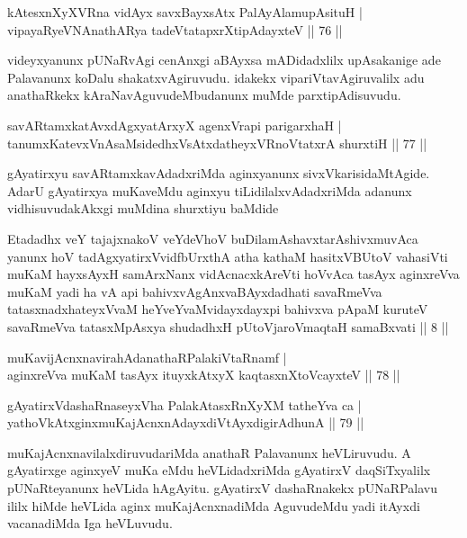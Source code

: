 \begin{shl}
kAtesxnXyXVRna vidAyx savxBayxsAtx PalAyAlamupAsituH | \\
vipayaRyeVNAnathARya tadeVtatapxrXtipAdayxteV \hfill||  76 ||
\end{shl}

\begin{artha} 
videyxyanunx pUNaRvAgi cenAnxgi aBAyxsa mADidadxlilx upAsakanige ade 
Palavanunx koDalu shakatxvAgiruvudu. idakekx vipariVtavAgiruvalilx adu 
anathaRkekx kAraNavAguvudeMbudanunx muMde parxtipAdisuvudu.
\end{artha}

\begin{shl}
savARtamxkatAvxdAgxyatArxyX agenxVrapi parigarxhaH | \\
tanumxKatevxVnAsaMsidedhxVsAtxdatheyxVRnoVtatxrA shurxtiH \hfill||  77 || 
\end{shl}

\begin{artha} 
gAyatirxyu savARtamxkavAdadxriMda aginxyanunx sivxVkarisidaMtAgide. 
AdarU gAyatirxya muKaveMdu aginxyu tiLidilalxvAdadxriMda adanunx 
vidhisuvudakAkxgi muMdina shurxtiyu baMdide\\
\begin{shl}
Etadadhx veY tajajxnakoV veYdeVhoV buDilamAshavxtarAshivxmuvAca yanunx hoV tadAgxyatirxVvidfbUrxthA atha kathaM hasitxVBUtoV vahasiVti muKaM hayxsAyxH samArxNanx vidAcnacxkAreVti hoVvAca tasAyx aginxreVva muKaM yadi ha vA api bahivxvAgAnxvaBAyxdadhati savaRmeVva tatasxnadxhateyxVvaM heYveYvaMvidayxdayxpi bahivxva pApaM kuruteV savaRmeVva tatasxMpAsxya shudadhxH pUtoV\s jaroV\s maqtaH samaBxvati || 8 ||
\end{shl}
\end{artha}


\begin{shl}
muKavijAcnxnavirahAdanathaRPalakiVtaRnamf | \\
aginxreVva muKaM tasAyx ituyxkAtxyX kaqtasxnXtoVcayxteV \hfill||  78 || 
\end{shl}

\begin{shl}
gAyatirxVdashaRnaseyxVha PalakAtasxRnXyXM tatheYva ca | \\
yathoVkAtxginxmuKajAcnxnAdayxdiVtAyxdigirA\s dhunA \hfill||  79 || 
\end{shl}

\begin{artha} 
muKajAcnxnavilalxdiruvudariMda anathaR Palavanunx heVLiruvudu. A 
gAyatirxge aginxyeV muKa eMdu heVLidadxriMda gAyatirxV daqSiTxyalilx 
pUNaRteyanunx heVLida hAgAyitu. gAyatirxV dashaRnakekx pUNaRPalavu 
ililx hiMde heVLida aginx muKajAcnxnadiMda AguvudeMdu yadi itAyxdi 
vacanadiMda Iga heVLuvudu.
\end{artha}


